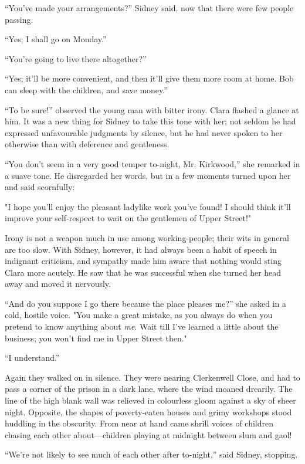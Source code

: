{\protect\hypertarget{75}{}{}}``You've made your arrangements?'' Sidney
said, now that there were few people passing.

``Yes; I shall go on Monday.''

``You're going to live there altogether?''

``Yes; it'll be more convenient, and then it'll give them more room at
home. Bob can sleep with the children, and save money.''

``To be sure!'' observed the young man with bitter irony. Clara flashed
a glance at him. It was a new thing for Sidney to take this tone with
her; not seldom he had expressed unfavourable judgments by silence, but
he had never spoken to her otherwise than with deference and gentleness.

``You don't seem in a very good temper to-night, Mr. Kirkwood,'' she
remarked in a suave tone. He disregarded her words, but in a few moments
turned upon her and said scornfully:

"I hope you'll enjoy the pleasant ladylike work you've found! I should
think it'll {\protect\hypertarget{76}{}{}}improve your self-respect to
wait on the gentlemen of Upper Street!"

Irony is not a weapon much in use among working-people; their wits in
general are too slow. With Sidney, however, it had always been a habit
of speech in indignant criticism, and sympathy made him aware that
nothing would sting Clara more acutely. He saw that he was successful
when she turned her head away and moved it nervously.

``And do you suppose I go there because the place pleases me?'' she
asked in a cold, hostile voice. "You make a great mistake, as you always
do when you pretend to know anything about \emph{me}. Wait till I've
learned a little about the business; you won't find me in Upper Street
then."

``I understand.''

Again they walked on in silence. They were nearing Clerkenwell Close,
and had to pass a corner of the prison in a dark lane, where the wind
moaned drearily. The line of the high blank wall was relieved in
colourless gloom against a sky of sheer night.
{\protect\hypertarget{77}{}{}}Opposite, the shapes of poverty-eaten
houses and grimy workshops stood huddling in the obscurity. From near at
hand came shrill voices of children chasing each other about---children
playing at midnight between slum and gaol!

``We're not likely to see much of each other after to-night,'' said
Sidney, stopping.

